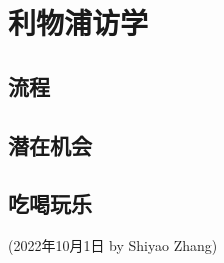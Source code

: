 \section{利物浦访学}

\subsection{流程}

\subsection{潜在机会}

\subsection{吃喝玩乐}


\begin{flushright}
    (2022年10月1日 by Shiyao Zhang)
\end{flushright}
